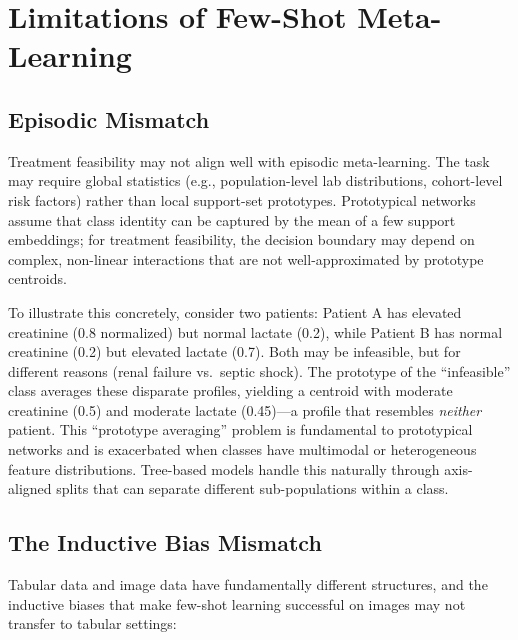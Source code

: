 \section{Limitations of Few-Shot Meta-Learning}

\subsection{Episodic Mismatch}

Treatment feasibility may not align well with episodic meta-learning. The task may require global statistics (e.g., population-level lab distributions, cohort-level risk factors) rather than local support-set prototypes. Prototypical networks assume that class identity can be captured by the mean of a few support embeddings; for treatment feasibility, the decision boundary may depend on complex, non-linear interactions that are not well-approximated by prototype centroids.

To illustrate this concretely, consider two patients: Patient A has elevated creatinine (0.8 normalized) but normal lactate (0.2), while Patient B has normal creatinine (0.2) but elevated lactate (0.7). Both may be infeasible, but for different reasons (renal failure vs.\ septic shock). The prototype of the ``infeasible'' class averages these disparate profiles, yielding a centroid with moderate creatinine (0.5) and moderate lactate (0.45)---a profile that resembles \emph{neither} patient. This ``prototype averaging'' problem is fundamental to prototypical networks and is exacerbated when classes have multimodal or heterogeneous feature distributions. Tree-based models handle this naturally through axis-aligned splits that can separate different sub-populations within a class.

\subsection{The Inductive Bias Mismatch}

Tabular data and image data have fundamentally different structures, and the inductive biases that make few-shot learning successful on images may not transfer to tabular settings:

